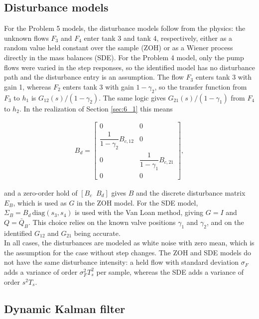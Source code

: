 \subsection{Disturbance models}

For the Problem 5 models, the disturbance models follow from the physics: the unknown flows $F_3$ and $F_4$ enter tank 3 and tank 4, respectively, either as a random value held constant over the sample (ZOH) or as a Wiener process directly in the mass balances (SDE). For the Problem 4 model, only the pump flows were varied in the step responses, so the identified model has no disturbance path and the disturbance entry is an assumption. The flow $F_3$ enters tank 3 with gain 1, whereas $F_2$ enters tank 3 with gain $1-\gamma_2$, so the transfer function from $F_3$ to $h_1$ is $G_{12}(s)/(1-\gamma_2)$. The same logic gives $G_{21}(s)/(1-\gamma_1)$ from $F_4$ to $h_2$. In the realization of Section \ref{sec:6_1} this means

\begin{align}
  B_d = \begin{bmatrix}
    0 & 0 \\
    \dfrac{1}{1-\gamma_2}B_{c,12} & 0 \\
    0 & \dfrac{1}{1-\gamma_1}B_{c,21} \\
    0 & 0
  \end{bmatrix},
\end{align}

and a zero-order hold of $[B_c\;\;B_d]$ gives $B$ and the discrete disturbance matrix $E_B$, which is used as $G$ in the ZOH model. For the SDE model, $\Sigma_B=B_d\,\mathrm{diag}(s_3,s_4)$ is used with the Van Loan method, giving $G=I$ and $Q=\bar Q_B$. This choice relies on the known valve positions $\gamma_1$ and $\gamma_2$, and on the identified $G_{12}$ and $G_{21}$ being accurate.\\

In all cases, the disturbances are modeled as white noise with zero mean, which is the assumption for the case without step changes. The ZOH and SDE models do not have the same disturbance intensity: a held flow with standard deviation $\sigma_F$ adds a variance of order $\sigma_F^2T_s^2$ per sample, whereas the SDE adds a variance of order $s^2T_s$. 

\subsection{Dynamic Kalman filter}

